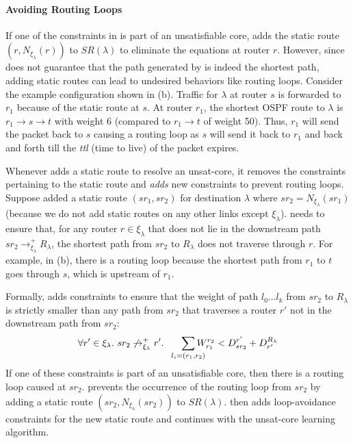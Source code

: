 

\paragraph{Avoiding Routing Loops} \label{sec:loopavoidance}
If one of the constraints in  is part of an unsatisfiable  
core, \name adds the static route $(r, N_{\xi_\lambda}(r))$ to
$SR(\lambda)$ to eliminate the equations at router $r$. 
However, since  does not guarantee that the path generated
by \genesis is indeed the shortest path, adding
static routes can lead to undesired behaviors like routing loops.  
Consider the example configuration shown in (b). 
Traffic for $\lambda$ at router $s$ is forwarded to $r_1$ because of the
static route at $s$. At router $r_1$, the shortest OSPF route to
$\lambda$ is $r_1 \rightarrow s \rightarrow t$ with weight 6 (compared 
to $r_1 \rightarrow t$ of weight 50). Thus, $r_1$ will send the 
packet back to $s$  causing a routing loop as $s$ will send
it back to $r_1$ and back and forth till the \emph{ttl} (time to live) of the
packet expires. 


Whenever \name adds a static route to resolve an unsat-core,
it removes the constraints pertaining to 
the static route and \emph{adds} new constraints to prevent
routing loops. 
Suppose \name added a static route $(sr_1, sr_2)$ for destination
$\lambda$ where $sr_2 = N_{\xi_\lambda}(sr_1)$ (because we do not add
static routes on any other links except $\xi_\lambda$). \name needs to
ensure that, for any router $r\in\xi_\lambda$ that does not 
lie in the downstream path $sr_2 \rightarrow^+_{\xi_\lambda} R_\lambda$, 
the shortest path from $sr_2$ to $R_\lambda$ does not traverse through 
$r$. For example, 
in (b), there is a routing loop because
 the shortest path from $r_1$ to $t$ goes through $s$, which is upstream of $r_1$. 

Formally, \name adds constraints to 
ensure that the weight
of path $l_0...l_k$
from $sr_2$ to $R_\lambda$ is 
strictly smaller than any path from $sr_2$ that traverses a
router $r'$ not in the downstream path from $sr_2$: 
\begin{equation}
\forall r' \in \xi_\lambda. ~sr_2 \not\rightarrow_{\xi_\lambda}^+ r'. 
~~~~~\sum_{\mathclap{\substack{l_i=(r_1,r_2)}}} 
W_{r_1}^{r_2} < D^{r'}_{sr_2} + D_{r'}^{R_\lambda} 
\end{equation}
If one of these constraints is part of an unsatisfiable
core, then there is a routing 
loop caused at $sr_2$. 
\name 
prevents
the occurrence of the routing loop from $sr_2$
by adding a static route 
$(sr_2, N_{\xi_\lambda}(sr_2))$ to $SR(\lambda)$. 
\name then adds loop-avoidance constraints for the new static
route and continues with the unsat-core learning algorithm. 

